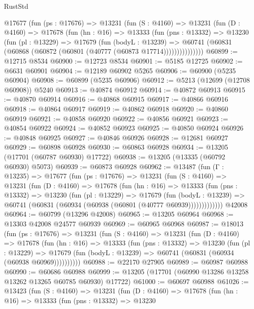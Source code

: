 \begin{lexlean}{RustStd}
\begin{coremodule}
      @17677
        (fun (ps : @17676) =>
        @13231
          (fun (S : @4160) =>
          @13231
            (fun (D : @4160) =>
            @17678
              (fun (hn : @16) =>
              @13333
                (fun (pns : @13332) =>
                @13230
                  (fun (pl : @13229) =>
                  @17679
                    (fun (bodyL : @13239) =>
                    @60741 (@60831 (@60868 (@60872 (@60801 (@40777 (@60873 @17714)))))))))))))))
@60899 := @12715 @8534
@60900 := @12723 @8534
@60901 := @5185 @12725
@60902 := @6631 @60901
@60904 := @12189 @60902 @5265
@60906 := @60900 (@5235 @60904)
@60908 := @60899 (@5235 @60906)
@60912 := @5213 (@12699 (@12708 @60908)) @5240
@60913 := @40874 @60912
@60914 := @40872 @60913
@60915 := @40870 @60914
@60916 := @40868 @60915
@60917 := @40866 @60916
@60918 := @40864 @60917
@60919 := @40862 @60918
@60920 := @40860 @60919
@60921 := @40858 @60920
@60922 := @40856 @60921
@60923 := @40854 @60922
@60924 := @40852 @60923
@60925 := @40850 @60924
@60926 := @40848 @60925
@60927 := @40846 @60926
@60928 := @12681 @60927
@60929 := @60898 @60928
@60930 := @60863 @60928
@60934 := @13205 (@17701 (@60787 @60930) @17722)
@60938 := @13205 (@13335 (@60792 @60930) @5073)
@60939 := @60873 @60928
@60962 := @13487
    (fun (Γ : @13235) =>
    @17677
      (fun (ps : @17676) =>
      @13231
        (fun (S : @4160) =>
        @13231
          (fun (D : @4160) =>
          @17678
            (fun (hn : @16) =>
            @13333
              (fun (pns : @13332) =>
              @13230
                (fun (pl : @13229) =>
                @17679
                  (fun (bodyL : @13239) =>
                  @60741 (@60831 (@60934 (@60938 (@60801 (@40777 @60939)))))))))))))
    @42008
@60964 := @60799 (@13296 @42008)
@60965 := @13205 @60964
@60968 := @13303 @42008 @24577 @60939
@60969 := @60965 @60968
@60987 := @18013
    (fun (ps : @17676) =>
    @13231
      (fun (S : @4160) =>
      @13231
        (fun (D : @4160) =>
        @17678
          (fun (hn : @16) =>
          @13333
            (fun (pns : @13332) =>
            @13230
              (fun (pl : @13229) =>
              @17679 (fun (bodyL : @13239) => @60741 (@60831 (@60934 (@60938 @60969))))))))))
@60988 := @22170 @27905
@60989 := @60987 @60988
@60990 := @60686 @60988
@60999 := @13205 (@17701 (@60990 @13286 @13258 @13262 @13265 @60785 @60930) @17722)
@61000 := @60697 @60988
@61026 := @13423
    (fun (S : @4160) =>
    @13231
      (fun (D : @4160) =>
      @17678
        (fun (hn : @16) =>
        @13333
          (fun (pns : @13332) =>
          @13230

\end{coremodule}
\end{lexlean}
